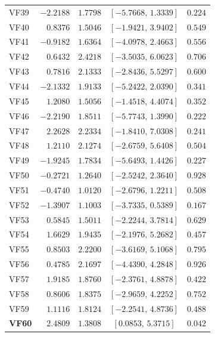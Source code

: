 \documentclass[10pt]{notes}
\begin{document}
\begin{landscape}
\begin{table}[p]
\begin{minipage}[t]{0.49\linewidth}
\begin{tabular}{lrrcr}
    VF39 & $-2.2188$ & $1.7798$ & $[-5.7668,\,1.3339]$ & $0.224$ \\
    VF40 & $0.8376$ & $1.5046$ & $[-1.9421,\,3.9402]$ & $0.549$ \\
    VF41 & $-0.9182$ & $1.6364$ & $[-4.0978,\,2.4663]$ & $0.556$ \\
    VF42 & $0.6432$ & $2.4218$ & $[-3.5035,\,6.0623]$ & $0.706$ \\
    VF43 & $0.7816$ & $2.1333$ & $[-2.8436,\,5.5297]$ & $0.600$ \\
    VF44 & $-2.1332$ & $1.9133$ & $[-5.2422,\,2.0390]$ & $0.341$ \\
    VF45 & $1.2080$ & $1.5056$ & $[-1.4518,\,4.4074]$ & $0.352$ \\
    VF46 & $-2.2190$ & $1.8511$ & $[-5.7743,\,1.3990]$ & $0.222$ \\
    VF47 & $2.2628$ & $2.2334$ & $[-1.8410,\,7.0308]$ & $0.241$ \\
    VF48 & $1.2110$ & $2.1274$ & $[-2.6759,\,5.6408]$ & $0.504$ \\
    VF49 & $-1.9245$ & $1.7834$ & $[-5.6493,\,1.4426]$ & $0.227$ \\
    VF50 & $-0.2721$ & $1.2640$ & $[-2.5242,\,2.3640]$ & $0.928$ \\
    VF51 & $-0.4740$ & $1.0120$ & $[-2.6796,\,1.2211]$ & $0.508$ \\
    VF52 & $-1.3907$ & $1.1003$ & $[-3.7335,\,0.5389]$ & $0.167$ \\
    VF53 & $0.5845$ & $1.5011$ & $[-2.2244,\,3.7814]$ & $0.629$ \\
    VF54 & $1.6629$ & $1.9435$ & $[-2.1976,\,5.2682]$ & $0.457$ \\
    VF55 & $0.8503$ & $2.2200$ & $[-3.6169,\,5.1068]$ & $0.795$ \\
    VF56 & $0.4785$ & $2.1697$ & $[-4.4390,\,4.2848]$ & $0.926$ \\
    VF57 & $1.9185$ & $1.8760$ & $[-2.3761,\,4.8878]$ & $0.422$ \\
    VF58 & $0.8606$ & $1.8375$ & $[-2.9659,\,4.2252]$ & $0.752$ \\
    VF59 & $1.1116$ & $1.8124$ & $[-2.2541,\,4.8736]$ & $0.488$ \\
    \textbf{VF60} & $\mathbf{2.4809}$ & $\mathbf{1.3808}$ & $\mathbf{[0.0853,\,5.3715]}$ & $\mathbf{0.042}$ \\
    \hline
    \end{tabular}
    \end{minipage}
\end{table}
\end{landscape}
\end{document}
